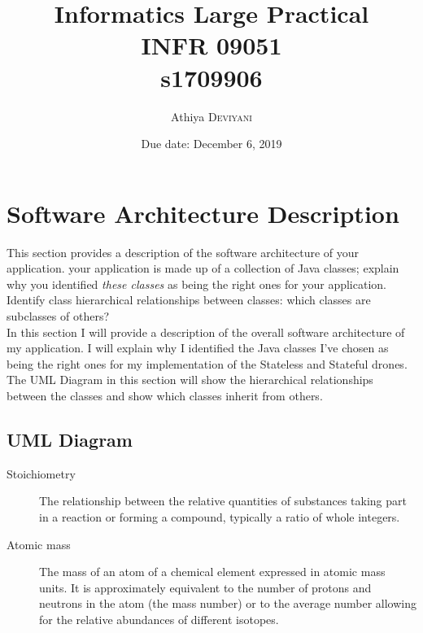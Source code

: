 \documentclass{article}
\title{Informatics Large Practical \\ INFR 09051 \\ s1709906} %
\author{Athiya \textsc{Deviyani}} %
\date{Due date: December 6, 2019} %
\begin{document}
\maketitle %





\pagebreak


\tableofcontents
\pagebreak


\section{Software Architecture Description}

This section provides a description of the software architecture of your application. your application is made up of a collection of Java classes; explain why you identified \textit{these classes} as being the right ones for your application. Identify class hierarchical relationships between classes: which classes are subclasses of others?\\[1]

In this section I will provide a description of the overall software architecture of my application. I will explain why I identified the Java classes I've chosen as being the right ones for my implementation of the Stateless and Stateful drones. The UML Diagram in this section will show the hierarchical relationships between the classes and show which classes inherit from others. 

\subsection{UML Diagram}
\label{UML Diagram}
\begin{description}
\item[Stoichiometry]
The relationship between the relative quantities of substances taking part in a reaction or forming a compound, typically a ratio of whole integers.
\item[Atomic mass]
The mass of an atom of a chemical element expressed in atomic mass units. It is approximately equivalent to the number of protons and neutrons in the atom (the mass number) or to the average number allowing for the relative abundances of different isotopes. 
\end{description} 
\end{document}
